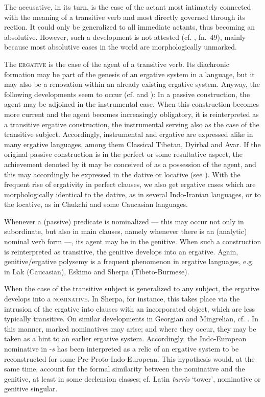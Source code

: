 The accusative, in its turn, is the case of the actant most intimately connected with the meaning of a transitive verb and most directly governed through its rection. It could only be generalized to all immediate actants, thus becoming an absolutive. However, such a development is not attested (cf. \citealt[101]{Dixon1979}, fn.~49), mainly because most absolutive cases in the world are morphologically unmarked.

The \textsc{ergative} is the case of the agent of a transitive verb. Its diachronic formation may be part of the genesis of an ergative system in a language, but it may also be a renovation within an already existing ergative system. Anyway, the following developments seem to occur (cf. \citealt{Anderson1977} and \citealt{Givón1980}): In a passive construction, the agent may be adjoined in the instrumental case. When this construction becomes more current and the agent becomes increasingly obligatory, it is reinterpreted as a transitive ergative construction, the instrumental serving also as the case of the transitive subject. Accordingly, instrumental and ergative are expressed alike in many ergative languages, among them Classical Tibetan, Dyirbal and Avar. If the original passive construction is in the perfect or some resultative aspect, the achievement denoted by it may be conceived of as a possession of the agent, and this may accordingly be expressed in the dative or locative (see \citealt{Seiler1973}). With the frequent rise of ergativity in perfect clauses, we also get ergative cases which are morphologically identical to the dative, as in several Indo-Iranian languages, or to the locative, as in Chukchi and some Caucasian languages.

Whenever a (passive) predicate is nominalized — this may occur not only in subordinate, but also in main clauses, namely whenever there is an (analytic) nominal verb form —, its agent may be in the genitive. When such a construction is reinterpreted as transitive, the genitive develops into an ergative. Again, genitive/ergative polysemy is a frequent phenomenon in ergative languages, e.g. in Lak (Caucasian), Eskimo and Sherpa (Tibeto-Burmese).

When the case of the transitive subject is generalized to any subject, the ergative develops into a \textsc{nominative}. In Sherpa, for instance, this takes place via the intrusion of the ergative into clauses with an incorporated object, which are less typically transitive. On similar developments in Georgian and Mingrelian, cf. \citet{Anderson1977}. In this manner, marked nominatives may arise; and where they occur, they may be taken as a hint to an earlier ergative system. Accordingly, the Indo-European nominative in -\textit{s} has been interpreted as a relic of an ergative system to be reconstructed for some Pre-Proto-Indo-European. This hypothesis would, at the same time, account for the formal similarity between the nominative and the genitive, at least in some declension classes; cf. Latin \textit{turris} ‘tower’, nominative or genitive singular.

